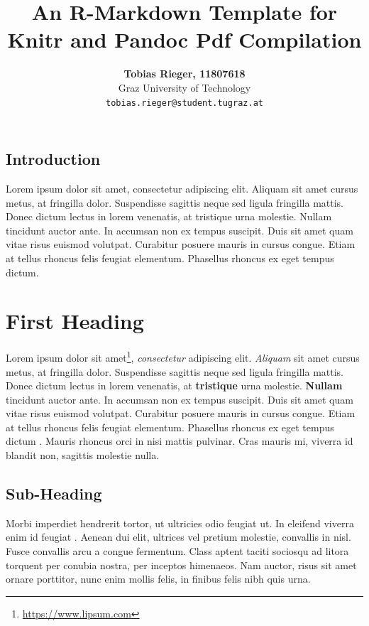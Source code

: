 \documentclass[
  11pt,
  a4paper, twocolumn]{article}
\author{\textbf{Tobias Rieger, 11807618}\\ Graz University of Technology\\ {\normalsize \texttt{tobias.rieger@student.tugraz.at}}}
\title{An R-Markdown Template for Knitr and Pandoc Pdf Compilation}
\date{}
\begin{document}
\maketitle

\begin{adjustwidth}{16pt}{16pt}
\section*{\centering Introduction}
Lorem ipsum dolor sit amet, consectetur adipiscing elit. Aliquam sit amet cursus metus, at fringilla dolor. Suspendisse sagittis neque sed ligula fringilla mattis. Donec dictum lectus in lorem venenatis, at tristique urna molestie. Nullam tincidunt auctor ante. In accumsan non ex tempus suscipit. Duis sit amet quam vitae risus euismod volutpat. Curabitur posuere mauris in cursus congue. Etiam at tellus rhoncus felis feugiat elementum. Phasellus rhoncus ex eget tempus dictum.
\end{adjustwidth}

\hypertarget{first-heading}{%
\section{First Heading}\label{first-heading}}

Lorem ipsum dolor sit amet\footnote{\url{https://www.lipsum.com}},
\emph{consectetur} adipiscing elit. \emph{Aliquam} sit amet cursus
metus, at fringilla dolor. Suspendisse sagittis neque sed ligula
fringilla mattis. Donec dictum lectus in lorem venenatis, at
\textbf{tristique} urna molestie. \textbf{Nullam} tincidunt auctor ante.
In accumsan non ex tempus suscipit. Duis sit amet quam vitae risus
euismod volutpat. Curabitur posuere mauris in cursus congue. Etiam at
tellus rhoncus felis feugiat elementum. Phasellus rhoncus ex eget tempus
dictum \citep{Chang2015}. Mauris rhoncus orci in nisi mattis pulvinar.
Cras mauris mi, viverra id blandit non, sagittis molestie nulla.

\hypertarget{sub-heading}{%
\subsection{Sub-Heading}\label{sub-heading}}

Morbi imperdiet hendrerit tortor, ut ultricies odio feugiat ut. In
eleifend viverra enim id feugiat \citep{RCoreTeam}. Aenean dui elit,
ultrices vel pretium molestie, convallis in nisl. Fusce convallis arcu a
congue fermentum. Class aptent taciti sociosqu ad litora torquent per
conubia nostra, per inceptos himenaeos. Nam auctor, risus sit amet
ornare porttitor, nunc enim mollis felis, in finibus felis nibh quis
urna.
\end{document}
